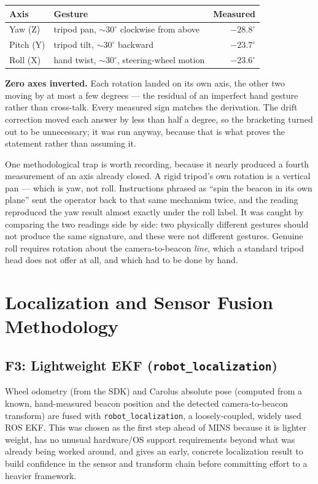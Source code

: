\documentclass[11pt]{article}
\begin{document}
\begin{center}
\begin{tabular}{llr}
\hline
Axis & Gesture & Measured \\
\hline
Yaw (Z) & tripod pan, $\sim30^\circ$ clockwise from above & $-28.8^\circ$ \\
Pitch (Y) & tripod tilt, $\sim30^\circ$ backward & $-23.7^\circ$ \\
Roll (X) & hand twist, $\sim30^\circ$, steering-wheel motion & $-23.6^\circ$ \\
\hline
\end{tabular}
\end{center}

\textbf{Zero axes inverted.} Each rotation landed on its own axis, the other
two moving by at most a few degrees --- the residual of an imperfect hand
gesture rather than cross-talk. Every measured sign matches the derivation.
The drift correction moved each answer by less than half a degree, so the
bracketing turned out to be unnecessary; it was run anyway, because that is
what proves the statement rather than assuming it.

One methodological trap is worth recording, because it nearly produced a
fourth measurement of an axis already closed. A rigid tripod's own rotation
is a vertical pan --- which is yaw, not roll. Instructions phrased as
``spin the beacon in its own plane'' sent the operator back to that same
mechanism twice, and the reading reproduced the yaw result almost exactly
under the roll label. It was caught by comparing the two readings side by
side: two physically different gestures should not produce the same
signature, and these were not different gestures. Genuine roll requires
rotation about the camera-to-beacon \emph{line}, which a standard tripod
head does not offer at all, and which had to be done by hand.

\section{Localization and Sensor Fusion Methodology}

\subsection{F3: Lightweight EKF (\texttt{robot\_localization})}
\label{sec:f3}
Wheel odometry (from the SDK) and Carolus absolute pose (computed from a
known, hand-measured beacon position and the detected camera-to-beacon
transform) are fused with \texttt{robot\_localization}, a loosely-coupled,
widely used ROS EKF. This was chosen as the first step ahead of MINS because
it is lighter weight, has no unusual hardware/OS support requirements beyond
what was already being worked around, and gives an early, concrete
localization result to build confidence in the sensor and transform chain
before committing effort to a heavier framework.
\end{document}
